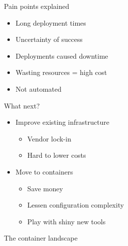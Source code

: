 \documentclass[17pt]{beamer}
\newcommand{\imageframe}[2]{{
  \usebackgroundtemplate{\texttt{[image: \#1]}}
  \begin{frame}{
    \vspace{-6pt}\usebeamercolor[fg]{item}
    \pgfsetfillopacity{0.8}
    \begin{snugshade}
    \centering #2
    \end{snugshade}
  }
  \end{frame}
}}
\begin{document}
  \begin{frame}{Pain points explained}
  \begin{itemize}
    \item<1-> Long deployment times
    \item<2-> Uncertainty of success
    \item<3-> Deployments caused downtime
    \item<4-> Wasting resources = high cost
    \item<5-> Not automated
  \end{itemize}
  \end{frame}

  \begin{frame}{What next?}
  \begin{itemize}
    \item<1-> Improve existing infrastructure
    \begin{itemize}
      \item Vendor lock-in
      \item Hard to lower costs
    \end{itemize}
    \bigskip
    \item<2-> Move to containers
    \begin{itemize}
      \item Save money
      \item Lessen configuration complexity
      \item Play with shiny new tools
    \end{itemize}
  \end{itemize}
  \end{frame}


  \imageframe{images/container_landscape.jpg}{The container landscape}
\end{document}
